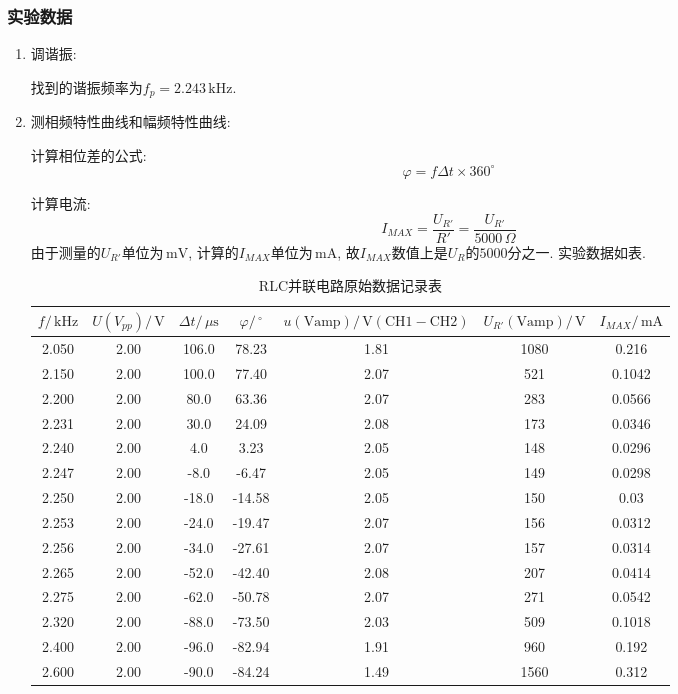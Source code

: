 \documentclass[11pt]{article}
\newcommand{\unit}[1]{\,\mathrm{#1}}
\newcommand{\cunit}[1]{\,#1} %
\begin{document}
\subsubsection{实验数据}
\begin{enumerate}
	
	\item 调谐振:
	
	找到的谐振频率为$f_p= 2.243\unit{kHz}$.
	
	\item 测相频特性曲线和幅频特性曲线:
	
	计算相位差的公式:
	\[
	\varphi = f \Delta t \times 360^\circ
	\]
	
	计算电流:
	\[
	I_{MAX} = \frac{U_{R'}}{R'} =  \frac{U_{R'}}{5000\cunit{\Omega}}
	\]
	由于测量的$U_{R'}$单位为$\unit{mV}$, 计算的$I_{MAX}$单位为$\unit{mA}$, 故$I_{MAX}$数值上是$U_R$的$5000$分之一. 实验数据如表.
	
	\begin{table}[htbp]
		\centering
		\begin{tabular}{|c|c|c|c|c|c|c|}
			\hline
			 $f/\unit{kHz}$    & $U(V_{pp})/\unit{V}$ &  $\Delta t/\cunit{\mu\mathrm{s}}$      & $\varphi/\cunit{^\circ}$     & $u\mathrm{(Vamp)}/\unit{V}\mathrm{(CH1-CH2)}$ &$U_{R'}\mathrm{(Vamp)}/\unit{V}$    &  $I_{MAX}/\unit{mA}$     \\ \hline
			2.050 & 2.00 & 106.0     & 78.23  & 1.81 & 1080 & 0.216  \\ \hline
			2.150 & 2.00 & 100.0     & 77.40  & 2.07 & 521  & 0.1042 \\ \hline
			2.200 & 2.00 & 80.0      & 63.36  & 2.07 & 283  & 0.0566 \\ \hline
			2.231 & 2.00 & 30.0      & 24.09  & 2.08 & 173  & 0.0346 \\ \hline
			2.240 & 2.00 & 4.0       & 3.23   & 2.05 & 148  & 0.0296 \\ \hline
			2.247 & 2.00 & -8.0      & -6.47  & 2.05 & 149  & 0.0298 \\ \hline
			2.250 & 2.00 & -18.0     & -14.58 & 2.05 & 150  & 0.03   \\ \hline
			2.253 & 2.00 & -24.0     & -19.47 & 2.07 & 156  & 0.0312 \\ \hline
			2.256 & 2.00 & -34.0     & -27.61 & 2.07 & 157  & 0.0314 \\ \hline
			2.265 & 2.00 & -52.0     & -42.40 & 2.08 & 207  & 0.0414 \\ \hline
			2.275 & 2.00 & -62.0     & -50.78 & 2.07 & 271  & 0.0542 \\ \hline
			2.320 & 2.00 & -88.0     & -73.50 & 2.03 & 509  & 0.1018 \\ \hline
			2.400 & 2.00 & -96.0     & -82.94 & 1.91 & 960  & 0.192  \\ \hline
			2.600 & 2.00 & -90.0     & -84.24 & 1.49 & 1560 & 0.312  \\ \hline
		\end{tabular}
		\caption{RLC并联电路原始数据记录表}
		\label{tab: parallel}
	\end{table}
\end{enumerate}
\end{document}
